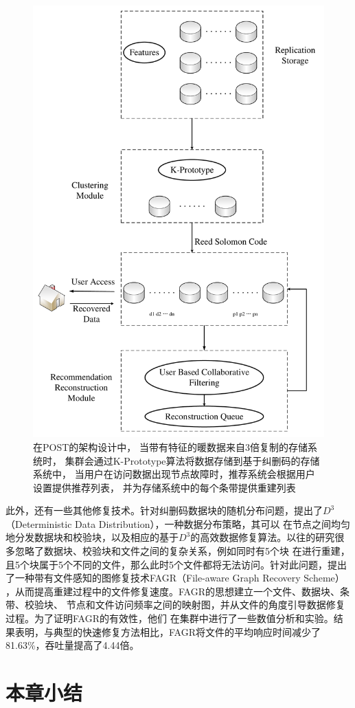 \begin{figure}[tb!]
	\centering
	\includegraphics [scale=0.2]{figures/2.5.pdf}
	\caption{在POST的架构设计中，
    当带有特征的暖数据来自3倍复制的存储系统时，
    集群会通过K-Prototype算法将数据存储到基于纠删码的存储系统中，
    当用户在访问数据出现节点故障时，推荐系统会根据用户设置提供推荐列表，
    并为存储系统中的每个条带提供重建列表}
	\label{fig:con-2.5}
\end{figure}

此外，还有一些其他修复技术。针对纠删码数据块的随机分布问题，\citet{xu2020deterministic}提出了$D^3$（Deterministic Data Distribution），一种数据分布策略，其可以
在节点之间均匀地分发数据块和校验块，以及相应的基于$D^3$的高效数据修复算法。以往的研究很多忽略了数据块、校验块和文件之间的复杂关系，例如同时有5个块
在进行重建，且5个块属于5个不同的文件，那么此时5个文件都将无法访问。针对此问题，\citet{zeng2020fagr}提出了一种带有文件感知的图修复技术FAGR（File-aware Graph Recovery Scheme）
，从而提高重建过程中的文件修复速度。FAGR的思想建立一个文件、数据块、条带、校验块、
节点和文件访问频率之间的映射图，并从文件的角度引导数据修复过程。为了证明FAGR的有效性，他们
在集群中进行了一些数值分析和实验。结果表明，与典型的快速修复方法相比，FAGR将文件的平均响应时间减少了81.63\%，吞吐量提高了4.44倍。


\section{本章小结}
